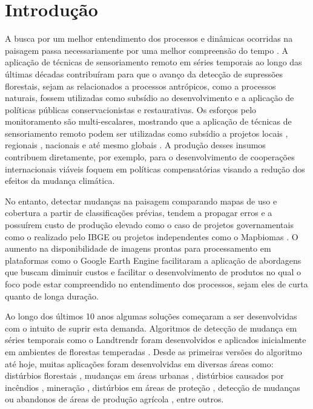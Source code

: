 \section{Introdução}
\hspace{13pt} A busca por um melhor entendimento dos processos e dinâmicas ocorridas na paisagem passa necessariamente por uma melhor compreensão do tempo \citep{gregory85}. 
A aplicação de técnicas de sensoriamento remoto em séries temporais ao longo das últimas décadas contribuíram para que o avanço da detecção de supressões florestais, sejam as relacionados a processos antrópicos, como a processos naturais, fossem utilizadas como subsídio ao desenvolvimento e a aplicação de políticas públicas conservacionistas e restaurativas. Os esforços pelo monitoramento são multi-escalares, mostrando que a aplicação de técnicas de sensoriamento remoto podem ser utilizadas como subsídio a projetos locais \citep{rs12111815}, regionais \citep{Vancutsemeabe1603, silva_junior_brazilian_2021, brandt_unexpectedly_2020}, nacionais \citep{rs12111790} e até mesmo globais \citep{Hansen850, crowther_mapping_2015, POTAPOV2021112165}. A produção desses insumos contribuem diretamente, por exemplo, para o desenvolvimento de cooperações internacionais viáveis foquem em políticas compensatórias visando a redução dos efeitos da mudança climática. 

No entanto, detectar mudanças na paisagem comparando mapas de uso e cobertura a partir de classificações prévias, tendem a propagar erros e a possuírem custo de produção elevado como o caso de projetos governamentais como o realizado pelo IBGE \citep{ibge2020} ou projetos independentes como o Mapbiomas \citep{Souza2019}. O aumento na disponibilidade de imagens prontas para processamento  \citep{rs12030426} em plataformas como o Google Earth Engine facilitaram a aplicação de abordagens que buscam diminuir custos e facilitar o desenvolvimento de produtos no qual o foco pode estar compreendido no entendimento dos processos, sejam eles de curta quanto de longa duração.

Ao longo dos últimos 10 anos algumas soluções começaram a ser desenvolvidas com o intuito de suprir esta demanda. Algoritmos de detecção de mudança em séries temporais como o Landtrendr foram desenvolvidos e aplicados inicialmente em ambientes de florestas temperadas \citep{KENNEDY2012117}. Desde as primeiras versões do algoritmo até hoje, muitas aplicações foram desenvolvidas em diversas áreas como: distúrbios florestais \citep{rs9050479, rs12223720}, mudanças em áreas urbanas \citep{rs12182883, rs13132438}, distúrbios causados por incêndios \citep{rs12091499, rs12233942}, mineração \citep{rs12101612, rs12142235}, distúrbios em áreas de proteção \citep{rs13091800}, detecção de mudanças ou abandonos de áreas de produção agrícola \citep{YIN201812, rs11101234, KOLECKA2021112340, DARA201849}, entre outros.

